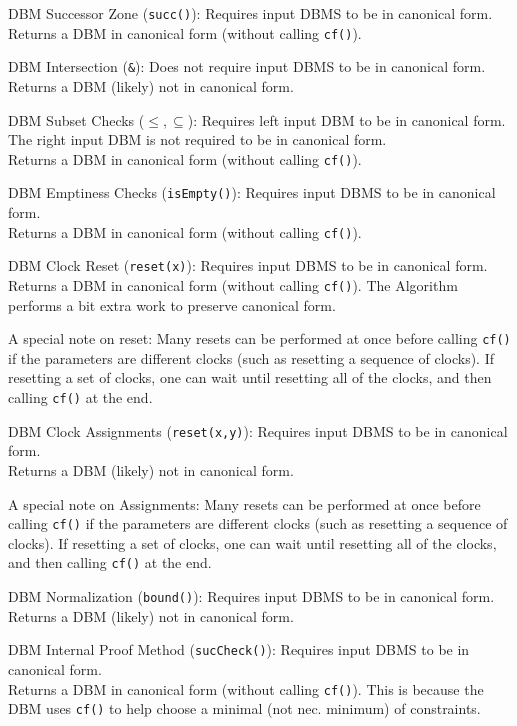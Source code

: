 \documentclass[11pt]{article}
\begin{document}
\begin{descriptionpf}
	\item[DBM Successor Zone (\texttt{succ()}):]  Requires input DBMS to be in canonical form.  \\ Returns a DBM in canonical form (without calling \texttt{cf()}).
	\item[DBM Intersection (\texttt{\&}):]  Does not require input DBMS to be in canonical form.  \\ Returns a DBM (likely) not in canonical form.
	\item[DBM Subset Checks ($\mathtt{\leq, \subseteq}$):]  Requires left input DBM to be in canonical form.  The right input DBM is not required to be in canonical form.  \\ Returns a DBM in canonical form (without calling \texttt{cf()}).
	\item[DBM Emptiness Checks (\texttt{isEmpty()}):]  Requires input DBMS to be in canonical form.  \\ Returns a DBM in canonical form (without calling \texttt{cf()}).
	\item[DBM Clock Reset (\texttt{reset(x)}):]  Requires input DBMS to be in canonical form.  \\ Returns a DBM in canonical form (without calling \texttt{cf()}).  The Algorithm performs a bit extra work to preserve canonical form.
	
	A special note on reset:  Many resets can be performed at once before calling \texttt{cf()} if the parameters are different clocks (such as resetting a sequence of clocks).  If resetting a set of clocks, one can wait until resetting all of the clocks, and then calling \texttt{cf()} at the end.

	\item[DBM Clock Assignments (\texttt{reset(x,y)}):]  Requires input DBMS to be in canonical form.  \\ Returns a DBM (likely) not in canonical form.
	
	A special note on Assignments:  Many resets can be performed at once before calling \texttt{cf()} if the parameters are different clocks (such as resetting a sequence of clocks).  If resetting a set of clocks, one can wait until resetting all of the clocks, and then calling \texttt{cf()} at the end.
	\item[DBM Normalization (\texttt{bound()}):]  Requires input DBMS to be in canonical form.  \\ Returns a DBM (likely) not in canonical form.
	\item[DBM Internal Proof Method (\texttt{sucCheck()}):]  Requires input DBMS to be in canonical form.  \\ Returns a DBM in canonical form (without calling \texttt{cf()}).  This is because the DBM uses \texttt{cf()} to help choose a minimal (not nec. minimum) of constraints.
\end{descriptionpf}
	
\end{document}
